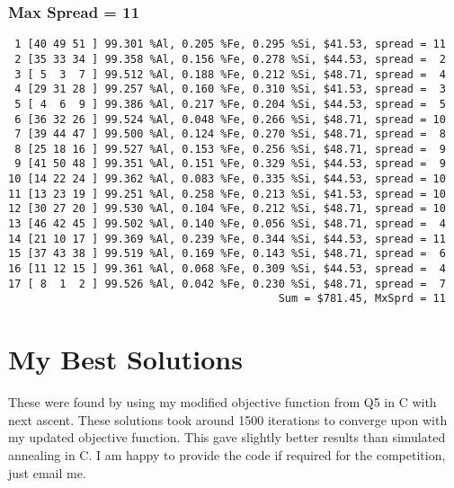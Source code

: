 \documentclass{article}
\begin{document}
\subsubsection{Max Spread = 11}
\begin{verbatim}
 1 [40 49 51 ] 99.301 %Al, 0.205 %Fe, 0.295 %Si, $41.53, spread = 11
 2 [35 33 34 ] 99.358 %Al, 0.156 %Fe, 0.278 %Si, $44.53, spread =  2
 3 [ 5  3  7 ] 99.512 %Al, 0.188 %Fe, 0.212 %Si, $48.71, spread =  4
 4 [29 31 28 ] 99.257 %Al, 0.160 %Fe, 0.310 %Si, $41.53, spread =  3
 5 [ 4  6  9 ] 99.386 %Al, 0.217 %Fe, 0.204 %Si, $44.53, spread =  5
 6 [36 32 26 ] 99.524 %Al, 0.048 %Fe, 0.266 %Si, $48.71, spread = 10
 7 [39 44 47 ] 99.500 %Al, 0.124 %Fe, 0.270 %Si, $48.71, spread =  8
 8 [25 18 16 ] 99.527 %Al, 0.153 %Fe, 0.256 %Si, $48.71, spread =  9
 9 [41 50 48 ] 99.351 %Al, 0.151 %Fe, 0.329 %Si, $44.53, spread =  9
10 [14 22 24 ] 99.362 %Al, 0.083 %Fe, 0.335 %Si, $44.53, spread = 10
11 [13 23 19 ] 99.251 %Al, 0.258 %Fe, 0.213 %Si, $41.53, spread = 10
12 [30 27 20 ] 99.530 %Al, 0.104 %Fe, 0.212 %Si, $48.71, spread = 10
13 [46 42 45 ] 99.502 %Al, 0.140 %Fe, 0.056 %Si, $48.71, spread =  4
14 [21 10 17 ] 99.369 %Al, 0.239 %Fe, 0.344 %Si, $44.53, spread = 11
15 [37 43 38 ] 99.519 %Al, 0.169 %Fe, 0.143 %Si, $48.71, spread =  6
16 [11 12 15 ] 99.361 %Al, 0.068 %Fe, 0.309 %Si, $44.53, spread =  4
17 [ 8  1  2 ] 99.526 %Al, 0.042 %Fe, 0.230 %Si, $48.71, spread =  7
                                          Sum = $781.45, MxSprd = 11
\end{verbatim}


\section{My Best Solutions}
These were found by using my modified objective function from Q5 in C
with next ascent. These solutions took around 1500 iterations to
converge upon with my updated objective function. This gave slightly 
better results than simulated annealing in C. I am happy to provide the
code if required for the competition, just email me.
\end{document}
